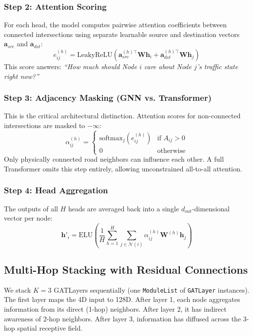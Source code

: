 \documentclass[12pt, onecolumn]{IEEEtran}
\begin{document}
\subsubsection{Step 2: Attention Scoring}
For each head, the model computes pairwise attention coefficients between connected intersections using separate learnable source and destination vectors $\mathbf{a}_{src}$ and $\mathbf{a}_{dst}$:
\begin{equation}
    e_{ij}^{(h)} = \text{LeakyReLU}\left( \mathbf{a}_{src}^{(h)\top} \mathbf{W}\mathbf{h}_i + \mathbf{a}_{dst}^{(h)\top} \mathbf{W}\mathbf{h}_j \right)
\end{equation}
This score answers: \textit{``How much should Node $i$ care about Node $j$'s traffic state right now?''}

\subsubsection{Step 3: Adjacency Masking (GNN vs. Transformer)}
This is the critical architectural distinction. Attention scores for non-connected intersections are masked to $-\infty$:
\begin{equation}
    \alpha_{ij}^{(h)} = \begin{cases}
        \text{softmax}_j(e_{ij}^{(h)}) & \text{if } A_{ij} > 0 \\
        0 & \text{otherwise}
    \end{cases}
\end{equation}
Only physically connected road neighbors can influence each other. A full Transformer omits this step entirely, allowing unconstrained all-to-all attention.

\subsubsection{Step 4: Head Aggregation}
The outputs of all $H$ heads are averaged back into a single $d_{out}$-dimensional vector per node:
\begin{equation}
    \mathbf{h}'_i = \text{ELU}\left( \frac{1}{H} \sum_{h=1}^{H} \sum_{j \in \mathcal{N}(i)} \alpha_{ij}^{(h)} \mathbf{W}^{(h)} \mathbf{h}_j \right)
\end{equation}

\subsection{Multi-Hop Stacking with Residual Connections}
We stack $K=3$ GATLayers sequentially (one \texttt{ModuleList} of \texttt{GATLayer} instances). The first layer maps the 4D input to 128D. After layer 1, each node aggregates information from its direct (1-hop) neighbors. After layer 2, it has indirect awareness of 2-hop neighbors. After layer 3, information has diffused across the 3-hop spatial receptive field.
\end{document}

